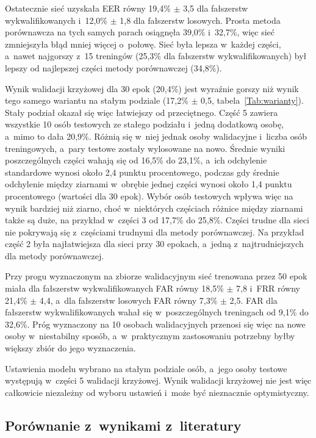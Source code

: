 \documentclass[12pt, twoside, openright]{article}
\begin{document}
Ostatecznie sieć uzyskała EER równy 19,4\% $\pm$ 3,5 dla fałszerstw wykwalifikowanych i~12,0\% $\pm$ 1,8 dla fałszerstw losowych.
Prosta metoda porównawcza na tych samych parach osiągnęła 39,0\% i~32,7\%, więc sieć zmniejszyła błąd mniej więcej o~połowę.
Sieć była lepsza w~każdej części, a~nawet najgorszy z~15 treningów (25,3\% dla fałszerstw wykwalifikowanych) był lepszy od najlepszej części metody porównawczej (34,8\%).

Wynik walidacji krzyżowej dla 30 epok (20,4\%) jest wyraźnie gorszy niż wynik tego samego wariantu na stałym podziale (17,2\% $\pm$ 0,5, tabela~\ref{Tab:warianty}).
Stały podział okazał się więc łatwiejszy od przeciętnego.
Część 5 zawiera wszystkie 10 osób testowych ze stałego podziału i~jedną dodatkową osobę, a~mimo to dała 20,9\%.
Różnią się w~niej jednak osoby walidacyjne i~liczba osób treningowych, a~pary testowe zostały wylosowane na nowo.
Średnie wyniki poszczególnych części wahają się od 16,5\% do 23,1\%, a~ich odchylenie standardowe wynosi około 2,4 punktu procentowego, podczas gdy średnie odchylenie między ziarnami w~obrębie jednej części wynosi około 1,4 punktu procentowego (wartości dla 30 epok).
Wybór osób testowych wpływa więc na wynik bardziej niż ziarno, choć w~niektórych częściach różnice między ziarnami także są duże, na przykład w~części 3 od 17,7\% do 25,8\%.
Części trudne dla sieci nie pokrywają się z~częściami trudnymi dla metody porównawczej.
Na przykład część 2 była najłatwiejsza dla sieci przy 30 epokach, a~jedną z~najtrudniejszych dla metody porównawczej.

Przy progu wyznaczonym na zbiorze walidacyjnym sieć trenowana przez 50 epok miała dla fałszerstw wykwalifikowanych FAR równy 18,5\% $\pm$ 7,8 i~FRR równy 21,4\% $\pm$ 4,4, a~dla fałszerstw losowych FAR równy 7,3\% $\pm$ 2,5.
FAR dla fałszerstw wykwalifikowanych wahał się w~poszczególnych treningach od 9,1\% do 32,6\%.
Próg wyznaczony na 10 osobach walidacyjnych przenosi się więc na nowe osoby w~niestabilny sposób, a~w~praktycznym zastosowaniu potrzebny byłby większy zbiór do jego wyznaczenia.

Ustawienia modelu wybrano na stałym podziale osób, a~jego osoby testowe występują w~części 5 walidacji krzyżowej.
Wynik walidacji krzyżowej nie jest więc całkowicie niezależny od wyboru ustawień i~może być nieznacznie optymistyczny.

\subsection{Porównanie z~wynikami z~literatury}
\label{Subsec:porownanie}
\end{document}
